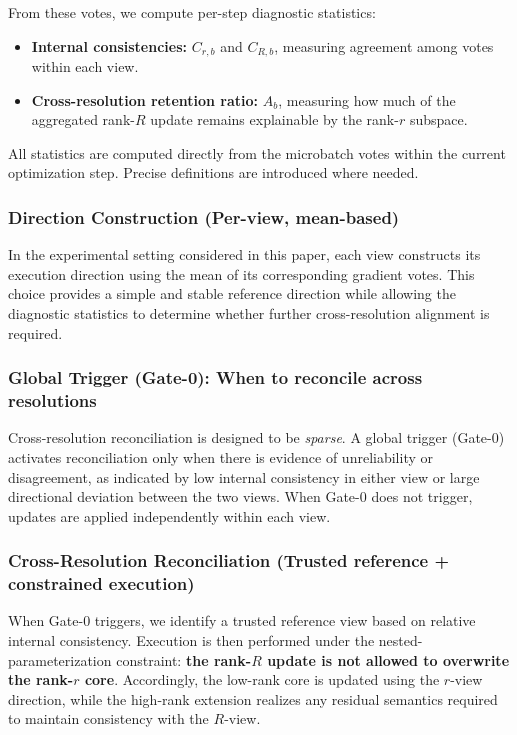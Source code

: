\documentclass{article}
\begin{document}
From these votes, we compute per-step diagnostic statistics:
\begin{itemize}
    \item \textbf{Internal consistencies:} $C_{r,b}$ and $C_{R,b}$,
    measuring agreement among votes within each view.
    \item \textbf{Cross-resolution retention ratio:} $A_b$,
    measuring how much of the aggregated rank-$R$ update remains explainable by the rank-$r$ subspace.
\end{itemize}
All statistics are computed directly from the microbatch votes within the current optimization step.
Precise definitions are introduced where needed.

\subsubsection{Direction Construction (Per-view, mean-based)}
In the experimental setting considered in this paper,
each view constructs its execution direction using the
mean of its corresponding gradient votes.
This choice provides a simple and stable reference direction
while allowing the diagnostic statistics to determine
whether further cross-resolution alignment is required.

\subsubsection{Global Trigger (Gate-0): When to reconcile across resolutions}
Cross-resolution reconciliation is designed to be \emph{sparse}.
A global trigger (Gate-0) activates reconciliation only when
there is evidence of unreliability or disagreement,
as indicated by low internal consistency in either view
or large directional deviation between the two views.
When Gate-0 does not trigger, updates are applied independently
within each view.

\subsubsection{Cross-Resolution Reconciliation (Trusted reference + constrained execution)}
When Gate-0 triggers, we identify a trusted reference view
based on relative internal consistency.
Execution is then performed under the nested-parameterization constraint:
\textbf{the rank-$R$ update is not allowed to overwrite the rank-$r$ core}.
Accordingly, the low-rank core is updated using the $r$-view direction,
while the high-rank extension realizes any residual semantics
required to maintain consistency with the $R$-view.
\end{document}
